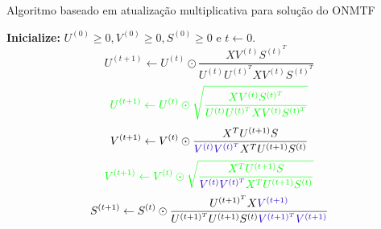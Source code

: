 \documentclass[
    12pt,                %
    oneside,            %
    a4paper,            %
    english,            %
    brazil                %
    ]{abntex2ppgsi}
\begin{document}

\begin{algorithm}
\caption{Algoritmo baseado em atualização multiplicativa para solução do ONMTF}
\label{algo:onmtf}
    \begin{algorithmic}[1]
            \State \textbf{Inicialize:} $U^{(0)} \geq 0, V^{(0)} \geq 0, S^{(0)} \geq 0$ e $t \gets 0$.
                \State
                    \begin{equation}
                    \label{eq:onmtf:updateU}
                        U^{(t+1)} \gets U^{(t)} \odot \frac{ X V^{(t)} S^{(t)^T} }{ U^{(t)} U^{(t)^T} X V^{(t)} S^{(t)^T} }      \nonumber
                    \end{equation}
                    \begin{equation}
                    \label{eq:onmtf:updateU}
                        \textcolor{green}{U^{(t+1)} \gets U^{(t)} \odot \sqrt{\frac{ X V^{(t)} S^{(t)^T} }{ U^{(t)} U^{(t)^T} X V^{(t)} S^{(t)^T} }}}      \nonumber
                    \end{equation}
                \State
                    \begin{equation}
                    \label{eq:onmtf:updateV}
                        V^{(t+1)} \gets V^{(t)} \odot \frac{ X^T U^{(t+1)} S }{ \textcolor{blue}{V^{(t)} V^{(t)^T}} X^T U^{(t+1)} S^{(t)} }      \nonumber
                    \end{equation}
                    \begin{equation}
                    \label{eq:onmtf:updateV}
                        \textcolor{green}{V^{(t+1)} \gets V^{(t)} \odot \sqrt{\frac{ X^T U^{(t+1)} S }{ \textcolor{blue}{V^{(t)} V^{(t)^T}} X^T U^{(t+1)} S^{(t)} }}}      \nonumber
                    \end{equation}                \State
                    \begin{equation}
                    \label{eq:onmtf:updateS}
                        S^{(t+1)} \gets S^{(t)} \odot \frac{ U^{(t+1)^T} X \textcolor{blue}{V^{(t+1)}} }{ U^{(t+1)^T} U^{(t+1)} S^{(t)} \textcolor{blue}{V^{(t+1)^T} V^{(t+1)}} }    \nonumber
                    \end{equation}

\end{algorithmic}
\end{algorithm}
\end{document}
